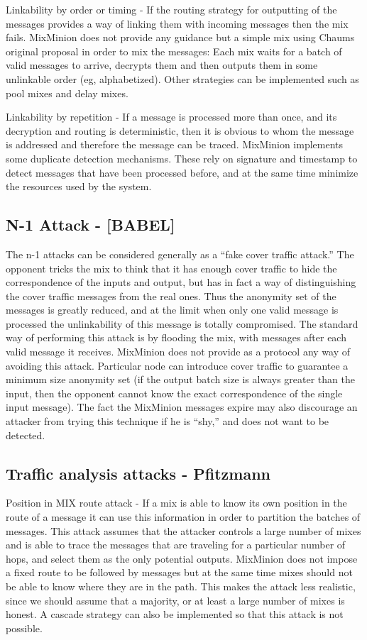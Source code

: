 \documentclass{article}
\begin{document}
Linkability by order or timing - If the routing strategy for
outputting of the messages provides a way of linking them with
incoming messages then the mix fails. MixMinion does not provide any
guidance but a simple mix using Chaums original proposal in order to
mix the messages: Each mix waits for a batch of valid messages to
arrive, decrypts them and then outputs them in some unlinkable
order (eg, alphabetized). Other strategies can be implemented such as
pool mixes and delay mixes.

Linkability by repetition - If a message is processed more than once,
and its decryption and routing is deterministic, then it is obvious to
whom the message is addressed and therefore the message can be
traced. MixMinion implements some duplicate detection
mechanisms. These rely on signature and timestamp to
detect messages that have been processed before, and at the same time
minimize the resources used by the system.

\subsection{N-1 Attack - [BABEL]}

The n-1 attacks can be considered generally as a ``fake cover traffic
attack.'' The opponent tricks the mix to think that it has enough cover
traffic to hide the correspondence of the inputs and output, but has
in fact a way of distinguishing the cover traffic messages from the
real ones. Thus the anonymity set of the
messages is greatly reduced, and at the limit when only one valid
message is processed the unlinkability of this message is totally
compromised. The standard way of performing this attack is by flooding
the mix, with messages after each valid message it receives. MixMinion
does not provide as a protocol any way of avoiding this
attack. Particular node can introduce cover
traffic to guarantee a minimum size anonymity set (if the output batch
size is always greater than the input, then the opponent cannot know
the exact correspondence of the single input message). The fact the
MixMinion messages expire may also discourage an attacker from trying
this technique if he is ``shy,'' and does not want to be detected.

\subsection{Traffic analysis attacks - Pfitzmann}

Position in MIX route attack - If a mix is able to know its own
position in the route of a message it can use this information in
order to partition the batches of messages. This attack assumes that
the attacker controls a large number of mixes and is able to trace the
messages that are traveling for a particular number of hops, and select
them as the only potential outputs. MixMinion does not impose a fixed
route to be followed by messages but at the same time mixes should not
be able to know where they are in the path. This makes the attack less
realistic, since we should assume that a majority, or at least a large
number of mixes is honest. A cascade strategy can also be implemented
so that this attack is not possible.
\end{document}
